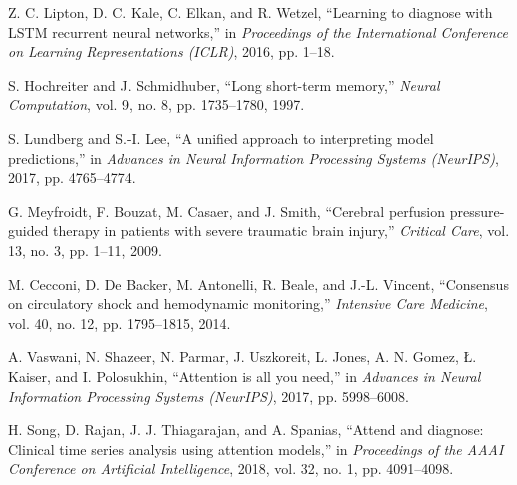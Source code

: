 \documentclass[conference]{IEEEtran}
\begin{document}
\begin{thebibliography}{00}
 Z. C. Lipton, D. C. Kale, C. Elkan, and R. Wetzel, ``Learning to diagnose with LSTM recurrent neural networks,'' in \textit{Proceedings of the International Conference on Learning Representations (ICLR)}, 2016, pp. 1–18.

 S. Hochreiter and J. Schmidhuber, ``Long short-term memory,'' \textit{Neural Computation}, vol. 9, no. 8, pp. 1735–1780, 1997.

 S. Lundberg and S.-I. Lee, ``A unified approach to interpreting model predictions,'' in \textit{Advances in Neural Information Processing Systems (NeurIPS)}, 2017, pp. 4765–4774.

 G. Meyfroidt, F. Bouzat, M. Casaer, and J. Smith, ``Cerebral perfusion pressure-guided therapy in patients with severe traumatic brain injury,'' \textit{Critical Care}, vol. 13, no. 3, pp. 1–11, 2009.

 M. Cecconi, D. De Backer, M. Antonelli, R. Beale, and J.-L. Vincent, ``Consensus on circulatory shock and hemodynamic monitoring,'' \textit{Intensive Care Medicine}, vol. 40, no. 12, pp. 1795–1815, 2014.

 A. Vaswani, N. Shazeer, N. Parmar, J. Uszkoreit, L. Jones, A. N. Gomez, Ł. Kaiser, and I. Polosukhin, ``Attention is all you need,'' in \textit{Advances in Neural Information Processing Systems (NeurIPS)}, 2017, pp. 5998–6008.

 H. Song, D. Rajan, J. J. Thiagarajan, and A. Spanias, ``Attend and diagnose: Clinical time series analysis using attention models,'' in \textit{Proceedings of the AAAI Conference on Artificial Intelligence}, 2018, vol. 32, no. 1, pp. 4091–4098.

\end{thebibliography}
\end{document}
